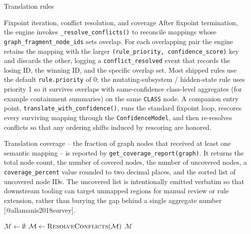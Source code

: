 \documentclass[
  ignorenonframetext,
]{beamer}
\begin{document}
\begin{frame}[fragile]{Translation rules}
\begin{block}{Fixpoint iteration, conflict resolution, and coverage}
After fixpoint termination, the engine invokes
\texttt{\_resolve\_conflicts()} to reconcile mappings whose
\texttt{graph\_fragment\_node\_ids} sets overlap. For each overlapping
pair the engine retains the mapping with the larger
\texttt{(rule\_priority,\ confidence\_score)} key and discards the
other, logging a \texttt{conflict\_resolved} event that records the
losing ID, the winning ID, and the specific overlap set. Most shipped
rules use the default \texttt{rule.priority} of 0; the
mutating-subsystem / hidden-state rule uses priority 1 so it survives
overlaps with same-confidence class-level aggregates (for example
containment summaries) on the same \texttt{CLASS} node. A companion
entry point, \texttt{translate\_with\_confidence()}, runs the standard
fixpoint loop, rescores every surviving mapping through the
\texttt{ConfidenceModel}, and then re-resolves conflicts so that any
ordering shifts induced by rescoring are honored.

Translation coverage -- the fraction of graph nodes that received at
least one semantic mapping -- is reported by
\texttt{get\_coverage\_report(graph)}. It returns the total node count,
the number of covered nodes, the number of uncovered nodes, a
\texttt{coverage\_percent} value rounded to two decimal places, and the
sorted list of uncovered node IDs. The uncovered list is intentionally
emitted verbatim so that downstream tooling can target unmapped regions
for manual review or rule extension, rather than burying the gap behind
a single aggregate number {[}@allamanis2018survey{]}.

\begin{algorithm}
\caption{Fixpoint translation engine}
\label{alg:fixpoint}
$\mathcal{M} \leftarrow \emptyset$\;
$\mathcal{M} \leftarrow \textsc{ResolveConflicts}(\mathcal{M})$\;
\Return $\mathcal{M}$\;
\end{algorithm}


\end{block}
\end{frame}
\end{document}
